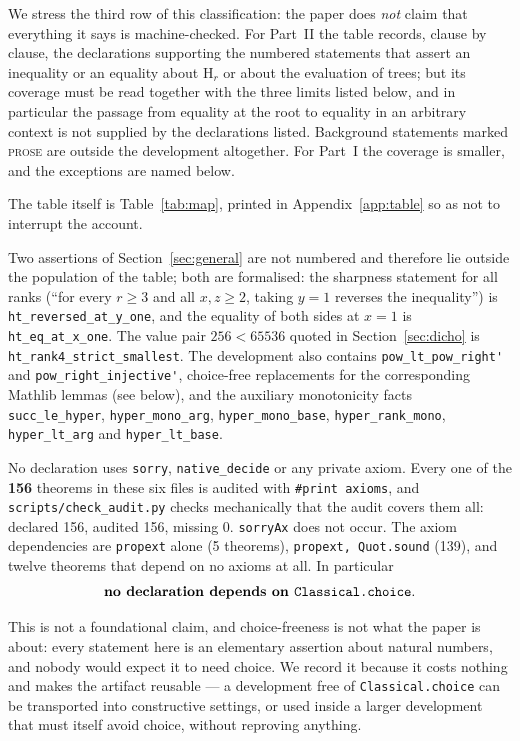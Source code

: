 \documentclass[11pt,a4paper]{article}
\theoremstyle{plain}
\theoremstyle{definition}
\newcommand{\HH}{\mathrm{H}}
\begin{document}
We stress the third row of this classification: the paper does \emph{not} claim that
everything it says is machine-checked. For Part~II the table records, clause by clause,
the declarations supporting the numbered statements that assert an inequality or an
equality about $\HH_r$ or about the evaluation of trees; but its coverage must be read
together with the three limits listed below, and in particular the passage from equality
at the root to equality in an arbitrary context is not supplied by the declarations
listed. Background statements marked \textsc{prose} are outside the development
altogether. For Part~I the coverage is smaller, and the exceptions are named below.

The table itself is Table~\ref{tab:map}, printed in Appendix~\ref{app:table} so as
not to interrupt the account.


Two assertions of Section~\ref{sec:general} are not numbered and therefore lie outside
the population of the table; both are formalised: the sharpness statement for all
ranks (``for every $r\ge3$ and all $x,z\ge2$, taking $y=1$ reverses the inequality'')
is \verb|ht_reversed_at_y_one|, and the equality of both sides at $x=1$ is
\verb|ht_eq_at_x_one|. The value pair $256<65536$ quoted in Section~\ref{sec:dicho}
is \verb|ht_rank4_strict_smallest|. The development also contains
\verb|pow_lt_pow_right'| and \verb|pow_right_injective'|, choice-free replacements
for the corresponding Mathlib lemmas (see below), and the auxiliary monotonicity
facts \verb|succ_le_hyper|, \verb|hyper_mono_arg|, \verb|hyper_mono_base|,
\verb|hyper_rank_mono|, \verb|hyper_lt_arg| and \verb|hyper_lt_base|.

No declaration uses \verb|sorry|, \verb|native_decide| or any private axiom.
Every one of the \textbf{156} theorems in these six files is audited with
\verb|#print axioms|, and \verb|scripts/check_audit.py| checks mechanically that the
audit covers them all: declared 156, audited 156, missing 0. \verb|sorryAx| does
not occur.
The axiom dependencies are \verb|propext| alone (5 theorems),
\verb|propext,|\allowbreak\verb| Quot.sound| (139), and twelve theorems that depend on
no axioms at all. In particular
\[
  \textbf{no declaration depends on } \verb|Classical.choice|.
\]

This is not a foundational claim, and choice-freeness is not what the paper is
about: every statement here is an elementary assertion about natural numbers, and
nobody would expect it to need choice. We record it because it costs nothing and
makes the artifact reusable --- a development free of \verb|Classical.choice| can be
transported into constructive settings, or used inside a larger development that
must itself avoid choice, without reproving anything.
\end{document}
